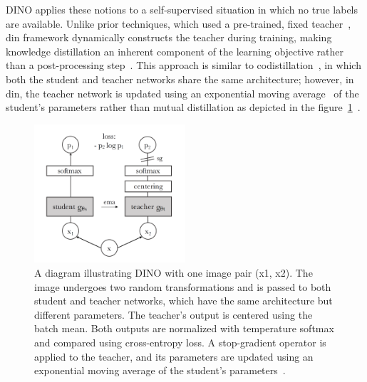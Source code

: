DINO applies these notions to a self-supervised situation in which no true labels are available. Unlike prior techniques, which used a pre-trained, fixed teacher~\citep{_13_big_ssl_chen2020big, _25_SEED_fang2021seed,_63_s2_bnn_shen2021s2,_47_boosting_ssl_KT_noroozi2018boosting}, \gls{din} framework dynamically constructs the teacher during training, making knowledge distillation an inherent component of the learning objective rather than a post-processing step~\citep{dino_caron2021emerging}. This approach is similar to codistillation~\citep{_1_codistillation_anil2018large}, in which both the student and teacher networks share the same architecture; however, in \gls{din}, the teacher network is updated using an exponential moving average~\citep{ema_polyak1992acceleration} of the student's parameters rather than mutual distillation as depicted in the figure~\ref{fig:dino_v1_arch}~\citep{dino_caron2021emerging}.

\begin{figure}[h]
\begin{center}
\includegraphics[width=0.5\textwidth]{Images_Thesis/dino_arch_v1.png}
\end{center}
\caption[Self Distillation with no labels]{ A diagram illustrating DINO with one image pair (x1, x2). The image undergoes two random transformations and is passed to both student and teacher networks, which have the same architecture but different parameters. The teacher's output is centered using the batch mean. Both outputs are normalized with temperature softmax and compared using cross-entropy loss. A stop-gradient operator is applied to the teacher, and its parameters are updated using an exponential moving average of the student's parameters~\citep{dino_caron2021emerging}.}
\label{fig:dino_v1_arch}
\end{figure}

